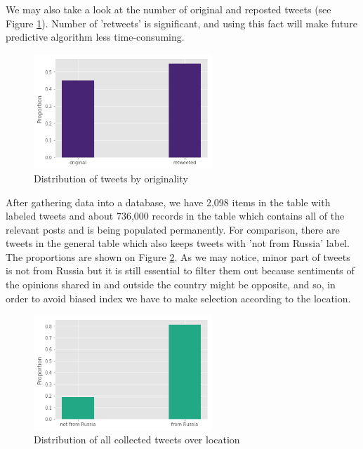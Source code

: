 \documentclass[12pt,a4paper]{article}
\begin{document}
We may also take a look at the number of original and reposted tweets (see Figure \ref{fig:all_distr_retweets}). Number of 'retweets' is significant, and using this fact will make future predictive algorithm less time-consuming.
\begin{figure}
\centering
\includegraphics[width=0.6\textwidth]{figures/all_distr_retweets.png}
\caption{Distribution of tweets by originality}
\label{fig:all_distr_retweets}
\end{figure}

After gathering data into a database, we have 2,098 items in the table with labeled tweets and about 736,000 records in the table which contains all of the relevant posts and is being populated permanently. For comparison, there are  tweets in the general table which also keeps tweets with 'not from Russia' label. The proportions are shown on Figure \ref{fig:distr_from_russia}. As we may notice, minor part of tweets is not from Russia but it is still essential to filter them out because sentiments of the opinions shared in and outside the country might be opposite, and so, in order to avoid biased index we have to make selection according to the location.
\newline
\begin{figure}
\centering
\includegraphics[width=0.6\textwidth]{figures/distr_from_russia.png}
\caption{Distribution of all collected tweets over location}
\label{fig:distr_from_russia}
\end{figure}
\newpage
\end{document}
